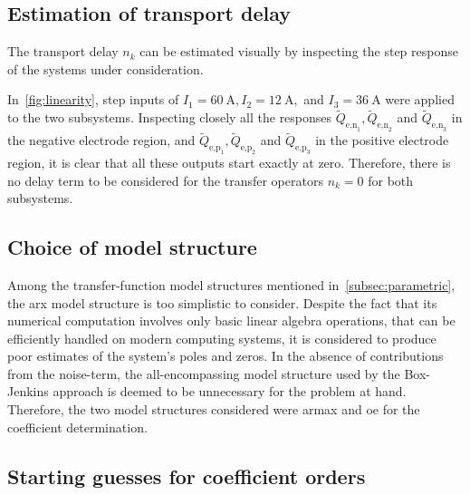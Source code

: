\subsection{Estimation of transport delay}

The transport delay $n_k$ can be estimated visually by inspecting the step
response of the systems under consideration.

In~\cref{fig:linearity},   step  inputs   of   $I_1   =  \SI{60}{\ampere},   I_2
=    \SI{12}{\ampere},$   and    $I_3   =    \SI{36}{\ampere}$   were    applied
to    the   two    subsystems.    Inspecting   closely    all   the    responses
\ie{}   $\widetilde{Q}_{\text{e,n}_1},    \widetilde{Q}_{\text{e,n}_2}   $   and
$\widetilde{Q}_{\text{e,n}_3}$    in    the     negative    electrode    region,
and    $\widetilde{Q}_{\text{e,p}_1},    \widetilde{Q}_{\text{e,p}_2}   $    and
$\widetilde{Q}_{\text{e,p}_3}$  in the  positive electrode  region, it  is clear
that all these outputs start exactly at  zero. Therefore, there is no delay term
to be considered for the transfer operators \ie{} $n_k = 0$ for both subsystems.

\subsection{Choice of model structure}\label{subsec:modelstrucchoice}

Among      the      transfer-function       model      structures      mentioned
in~\cref{subsec:parametric}, the \gls{arx} model  structure is too simplistic to
consider. Despite  the fact that  its numerical computation involves  only basic
linear algebra operations,  that can be efficiently handled  on modern computing
systems, it  is considered to produce  poor estimates of the  system's poles and
zeros. In the absence of contributions from the noise-term, the all-encompassing
model structure used by the Box-Jenkins approach is deemed to be unnecessary for
the  problem  at hand.  Therefore,  the  two  model structures  considered  were
\gls{armax} and \gls{oe} for the coefficient determination.

\subsection{Starting guesses for coefficient orders}\label{subsec:initguesscoefforder}

